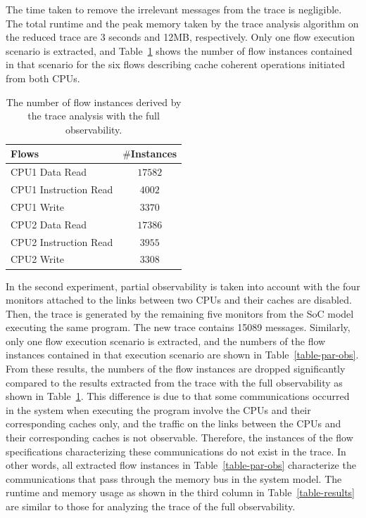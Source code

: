 \documentclass[conference]{IEEEtran}
\begin{document}
The time taken to remove the irrelevant messages from the
trace is negligible.  The total runtime and the peak memory
taken by the trace analysis algorithm on the reduced
trace are 3 seconds and 12MB, respectively.  Only one flow execution
scenario is extracted, and 
Table~\ref{table-case-2} shows the number of flow instances contained in that
scenario for the six 
flows describing cache coherent operations initiated from both CPUs.
\begin{table}[tb]
\caption{The number of flow instances derived by the trace analysis with the full observability.}
\begin{center}
\begin{tabular}{|l|c|}
\hline
Flows & $\#$Instances \\
\hline
\hline
CPU1 Data Read			&  $17582$\\
CPU1 Instruction Read		&  $4002$\\
CPU1 Write				&  $3370$\\
\hline
CPU2 Data Read			&  $17386$\\
CPU2 Instruction Read		&  $3955$\\
CPU2 Write				&  $3308$\\
\hline
\end{tabular}
\end{center}
\label{table-case-2}
\end{table}%

In the second experiment, partial observability is taken into account
with the four monitors attached to the links between two CPUs and their
caches are disabled. Then, the trace is generated by the
remaining five monitors from the SoC model executing the
same program.  The new trace contains 15089 messages.  
Similarly, only one flow execution
scenario is extracted, and the numbers of the
flow instances contained in that execution scenario are
shown in Table~\ref{table-par-obs}.  From these results, the
numbers of the flow instances are dropped significantly
compared to the results extracted from the trace with the
full observability as shown in
Table~\ref{table-case-2}. This difference is due to that
some communications occurred in the system when executing
the program involve the CPUs and their corresponding caches
only, and the traffic on the links between the CPUs and
their corresponding caches is not observable. Therefore, the
instances of the flow specifications characterizing these
communications do not exist in the trace. In other words,
all extracted flow instances in Table~\ref{table-par-obs}
characterize the communications that pass through the memory
bus in the system model.  The runtime and memory usage as shown in
the third column in Table~\ref{table-results} are
similar to those for analyzing the trace of the full
observability.
\end{document}
